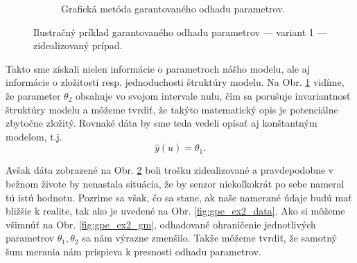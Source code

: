 \begin{figure}
\begin{subfigure}[b]{0.48\textwidth}
		\caption{Grafická metóda garantovaného odhadu parametrov.}
		\label{fig:gpe_ex1_gm}
	\end{subfigure}
	\caption{Ilustračný príklad garantovaného odhadu parametrov --- variant 1 --- zidealizovaný prípad.}
	\label{fig:gpe_ex1}
\end{figure}

Takto sme získali nielen informácie o parametroch nášho modelu, ale aj informácie o zložitosti resp. jednoduchosti štruktúry modelu. Na Obr. \ref{fig:gpe_ex1_gm} vidíme, že parameter $ \theta_2 $ obsahuje vo svojom intervale nulu, čím sa porušuje invariantnosť štruktúry modelu a môžeme tvrdiť, že takýto matematický opis je potenciálne zbytočne zložitý. Rovnaké dáta by sme teda vedeli opísať aj konštantným modelom, t.j. 
\begin{equation}
	\hat{y}(u) = \theta_1.
\end{equation}

 Avšak dáta zobrazené na Obr. \ref{fig:gpe_ex1} boli trošku zidealizované a pravdepodobne v bežnom živote by nenastala situácia, že by senzor niekoľkokrát po sebe nameral tú istú hodnotu. Pozrime sa však, čo sa stane, ak naše namerané údaje budú mať bližšie k realite, tak ako je uvedené na Obr. \ref{fig:gpe_ex2_data}. Ako si môžeme všimnúť na Obr. \ref{fig:gpe_ex2_gm}, odhadované ohraničenie jednotlivých parametrov $ \theta_1, \theta_2 $ sa nám výrazne zmenšilo. Takže môžeme tvrdiť, že samotný šum merania nám prispieva k presnosti odhadu parametrov. 

